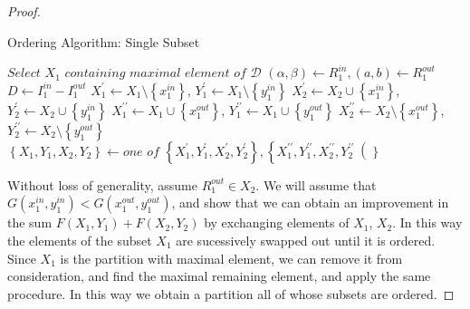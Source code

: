 \documentclass{article}
\makeatletter
\theoremstyle{case}
\def\BState{\State\hskip-\ALG@thistlm}
\makeatother
\begin{document}
\begin{proof}
\begin{algorithm}
\caption{Ordering Algorithm: Single Subset}
\begin{algorithmic}[1]
\State $\textit{Select } X_1 \textit{ containing maximal element of } \mathcal{D}$
\State $\left( \alpha , \beta \right) \gets R_1^{in}, \left( a,b \right) \gets R_1^{out}$
\State $D \gets I_1^{in} - I_1^{out}$
\State $X_1^\prime \gets X_1\setminus \left\lbrace x_1^{in}\right\rbrace$, $Y_1^{\prime} \gets X_1\setminus \left\lbrace y_1^{in}\right\rbrace$
\State $X_2^{\prime} \gets X_2\cup \left\lbrace x_1^{in}\right\rbrace$, $Y_2^{\prime} \gets X_2\cup \left\lbrace y_1^{in}\right\rbrace$
\EndIf
{}
\State $X_1^{\prime\prime} \gets X_1\cup \left\lbrace x_1^{out}\right\rbrace$, $Y_1^{\prime\prime} \gets X_1\cup \left\lbrace y_1^{out}\right\rbrace$
\State $X_2^{\prime\prime} \gets X_2\setminus \left\lbrace x_1^{out}\right\rbrace$, $Y_2^{\prime\prime} \gets X_2\setminus \left\lbrace y_1^{out}\right\rbrace$
\EndIf
{}
\State $\left\lbrace X_1, Y_1, X_2, Y_2 \right\rbrace \gets \textit{one of } \left\lbrace X_1^{\prime}, Y_1^{\prime}, X_2^{\prime}, Y_2^{\prime}\right\rbrace, \left\lbrace X_1^{\prime\prime}, Y_1^{\prime\prime}, X_2^{\prime\prime}, Y_2^{\prime\prime}\right(\rbrace$
\EndIf
{}
\EndWhile
\end{algorithmic}
\end{algorithm}



 Without loss of generality, assume $R_1^{out} \in X_2$. We will assume that $G(x_1^{in}, y_1^{in}) < G(x_1^{out}, y_1^{out})$, and show that we can obtain an improvement in the sum $F(X_1, Y_1) + F(X_2, Y_2)$ by exchanging elements of $X_1$, $X_2$. In this way the elements of the subset $X_1$ are sucessively swapped out until it is ordered. Since $X_1$ is the partition with maximal element, we can remove it from consideration, and find the maximal remaining element, and apply the same procedure. In this way we obtain a partition all of whose subsets are ordered.


\end{proof}
\end{document}
